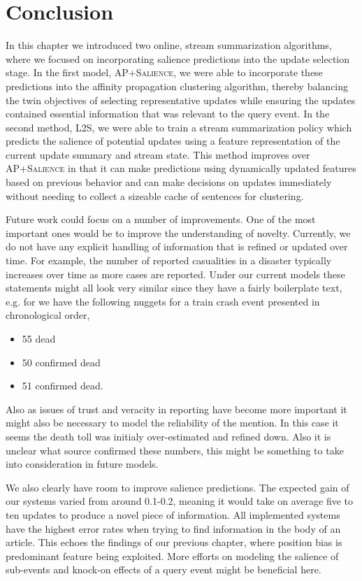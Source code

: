\section{Conclusion}

In this chapter we introduced two online, stream summarization algorithms, 
where
we focused on incorporating salience predictions into the update
selection stage. In the first model, \textsc{AP+Salience}, we were able to
incorporate these predictions into the affinity propagation clustering 
algorithm, thereby balancing the twin objectives of selecting representative
updates while ensuring the updates contained essential information that 
was relevant to the query event. In the second method,  \textsc{L2S},
we were able to train a stream summarization policy which predicts the salience
of potential updates using a feature representation of the current update
summary and stream state. This method improves over \textsc{AP+Salience}
in that it can make predictions using dynamically updated features based
on previous behavior and can make decisions on updates immediately
 without needing to collect a sizeable cache of sentences for clustering.

Future work could focus on a number of improvements. One of the most important
ones would be to improve the understanding of novelty. Currently, we do not
have any explicit handling of information that is refined or updated over time.
For example, the number of reported casualities in a disaster typically
increases over time as more cases are reported. Under our current models
these statements might all look very similar since they have a fairly 
boilerplate text, e.g. for we have the following nuggets for a train 
crash event presented in chronological order,
\begin{itemize}
\item 55 dead
\item 50 confirmed dead
\item 51 confirmed dead.
\end{itemize}
Also as issues of trust and veracity in reporting have become more important
it might also be necessary to model the reliability of the mention. In this
case it seems the death toll was initialy over-estimated and refined down.
Also it is unclear what source confirmed these numbers, this might be 
something to take into consideration in future models. 

We also clearly have room to improve salience predictions. The expected gain
of our systems varied from around 0.1-0.2, meaning it would take on average five to ten updates to produce a novel piece of information. All implemented
systems have the highest error rates when trying to find information in the 
body of an article. This echoes the findings of our previous chapter, where
position bias is predominant feature being exploited. More efforts on 
modeling the salience of sub-events and knock-on effects of a query event
might be beneficial here. 


